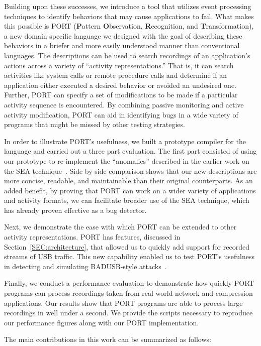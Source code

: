 Building upon these successes,
we introduce a tool
that utilizes event processing techniques
to identify
behaviors 
that may cause applications to fail.
What makes this possible is PORT
(\textbf{P}attern \textbf{O}bservation, \textbf{R}ecognition, and
\textbf{T}ransformation),
a new domain specific language
we designed with the goal of
describing
these behaviors
in a briefer and more easily understood manner than conventional languages.
The descriptions can be used
to search recordings of an application's actions
across a variety of ``activity representations.'' That is, it can search activities like
system calls
or remote procedure calls and determine if  an application either executed a desired behavior
or avoided an undesired one.
Further, PORT can specify
a set of modifications
to be made
if a particular activity sequence is encountered.
By combining passive monitoring and active activity modification,
PORT can aid in identifying bugs
in a wide variety of programs
that might be missed by other testing strategies.

In order to illustrate PORT's usefulness,
we built a prototype compiler
for the language
and carried out a three part evaluation.
The first part consisted of using our prototype
to
re-implement the ``anomalies''
described in the earlier work on the SEA technique~\cite{DBLP:conf/issre/MooreCFW19}.
Side-by-side comparison shows that our new
descriptions are more concise,
readable,
and maintainable
than their original counterparts.
As an added benefit, by proving that
PORT can work on a wider variety of applications and activity formats, we can facilitate broader use of the SEA technique,
which has already proven effective as a bug detector.

Next,
we demonstrate the ease with which PORT can be extended to
other activity representations. 
PORT has features, discussed in
Section~\ref{SEC:architecture},
that allowed us to quickly
add support for recorded streams of USB
traffic. This new capability enabled us to test PORT's usefulness in detecting and simulating BADUSB-style attacks~\cite{badusb}.

Finally,
we conduct a performance evaluation
to demonstrate how quickly  PORT programs can
process recordings taken from real world network and compression applications.
Our results show that PORT programs are able to process large recordings in well under a second. We provide the scripts necessary to reproduce our performance figures along with our PORT implementation.


The main contributions in this work can be summarized as follows:


